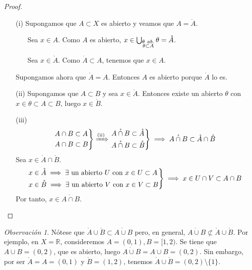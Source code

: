 \documentclass[12pt]{report}
\theoremstyle{definition}
\theoremstyle{definition}
\theoremstyle{remark}
\newtheorem*{obs}{Observación} %
\newcommand{\R}{\mathbb R}
\begin{document}
\begin{proof}
\hfill
\begin{itemize}
    \item[(i)] Supongamos que $A \subset X$ es abierto y veamos que $A = \mathring{A}$.
    \begin{itemize}
        \item[{\fbox[rb]{$\subset$}}] Sea $x \in A$. Como $A$ es abierto, $x \in \bigcup_{\substack{\theta \emph{ ab.} \\ \theta \subset A}}\theta = \mathring{A}$.
        \item[{\fbox[rb]{$\supset$}}] Sea $x \in \mathring{A}$. Como $\mathring{A} \subset A$, tenemos que $x \in A$.
    \end{itemize}
    
    Supongamos ahora que $\mathring{A} = A$. Entonces $A$ es abierto porque $\mathring{A}$ lo es.
    \item[(ii)] Supongamos que $A \subset B$ y sea $x \in \mathring{A}$. Entonces existe un abierto $\theta$ con $x \in \theta \subset A \subset B$, luego $x \in \mathring{B}$.
    \item[(iii)] \fbox[rb]{$\subset$} 
    \[
    \begin{rcases}
    A \cap B \subset A \\
    A \cap B \subset B
    \end{rcases} \xRightarrow{\text{(ii)}}
    \begin{rcases}
    \mathring{A \cap B} \subset \mathring{A} \\
    \mathring{A \cap B} \subset \mathring{B}
    \end{rcases} \implies \mathring{A \cap B} \subset \mathring{A} \cap \mathring{B}
    \]
    \fbox[rb]{$\supset$} Sea $x \in \mathring{A} \cap \mathring{B}$.
    \[
    \begin{rcases}
        x \in \mathring{A} \implies \exists$ un abierto $U$ con $x \in U \subset A \\
        x \in \mathring{B} \implies \exists$ un abierto $V$ con $x \in V \subset B
    \end{rcases} \implies x \in U \cap V \subset A \cap B
    \]
    Por tanto, $x \in \mathring{A \cap B}$.
\end{itemize}
\end{proof}

\begin{obs}
Nótese que $\mathring{A} \cup \mathring{B} \subset \mathring{A \cup B}$ pero, en general, $\mathring{A \cup B} \not\subset \mathring{A} \cup \mathring{B}$. Por ejemplo, en $X = \R$, consideremos $A = (0,1), B = [1,2)$. Se tiene que $A \cup B = (0,2)$, que es abierto, luego $\mathring{A \cup B} = A \cup B = (0,2)$. Sin embargo, por ser $\mathring{A} = A = (0,1)$ y $\mathring{B} = (1,2)$, tenemos $\mathring{A} \cup \mathring{B} = (0,2) \setminus \{1\}$.
\end{obs}
\end{document}
